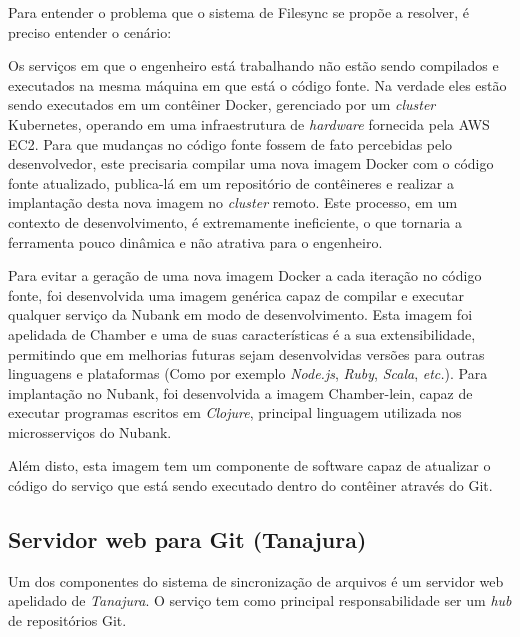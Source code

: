 	Para entender o problema que o sistema de Filesync se propõe a resolver, é preciso entender o cenário:
	
	Os serviços em que o engenheiro está trabalhando não estão sendo compilados e executados na mesma máquina em que está o código fonte. Na verdade eles estão sendo executados em um contêiner Docker, gerenciado por um \textit{cluster} Kubernetes, operando em uma infraestrutura de \textit{hardware} fornecida pela AWS EC2. Para que mudanças no código fonte fossem de fato percebidas pelo desenvolvedor, este precisaria compilar uma nova imagem Docker com o código fonte atualizado, publica-lá em um repositório de contêineres e realizar a implantação desta nova imagem no \textit{cluster} remoto. Este processo, em um contexto de desenvolvimento, é extremamente ineficiente, o que tornaria a ferramenta pouco dinâmica e não atrativa para o engenheiro.

	Para evitar a geração de uma nova imagem Docker a cada iteração no código fonte, foi desenvolvida uma imagem genérica capaz de compilar e executar qualquer serviço da Nubank em modo de desenvolvimento. Esta imagem foi apelidada de Chamber e uma de suas características é a sua extensibilidade, permitindo que em melhorias futuras sejam desenvolvidas versões para outras linguagens e plataformas (Como por exemplo \textit{Node.js}, \textit{Ruby}, \textit{Scala}, \textit{etc.}). Para implantação no Nubank, foi desenvolvida a imagem Chamber-lein, capaz de executar programas escritos em \textit{Clojure}, principal linguagem utilizada nos microsserviços do Nubank.
	
	Além disto, esta imagem tem um componente de software capaz de atualizar o código do serviço que está sendo executado dentro do contêiner através do Git.
	
	
	\subsection{Servidor web para Git (Tanajura)}
	Um dos componentes do sistema de sincronização de arquivos é um servidor web apelidado de \textit{Tanajura}. O serviço tem como principal responsabilidade ser um \textit{hub} de repositórios Git.
	
